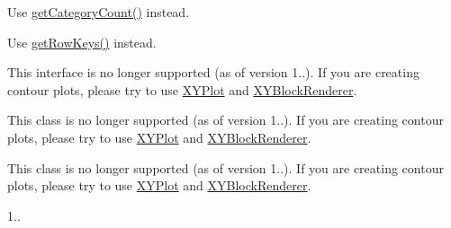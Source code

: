 \begin{DoxyRefList}
\item[\label{deprecated__deprecated000254}%
\Hypertarget{deprecated__deprecated000254}%
Member \mbox{\hyperlink{classorg_1_1jfree_1_1data_1_1category_1_1_default_interval_category_dataset_a565a96d7e8d9e7dee48ce40be982a54a}{org.jfree.data.category.Default\+Interval\+Category\+Dataset.get\+Item\+Count}} ()]Use \mbox{\hyperlink{classorg_1_1jfree_1_1data_1_1category_1_1_default_interval_category_dataset_af1e71ac84aa326b3b7ef89c398e5c0fb}{get\+Category\+Count()}} instead.  
\item[\label{deprecated__deprecated000252}%
\Hypertarget{deprecated__deprecated000252}%
Member \mbox{\hyperlink{classorg_1_1jfree_1_1data_1_1category_1_1_default_interval_category_dataset_a7e8cc76c4ac97fbf13459f1343ac5d91}{org.jfree.data.category.Default\+Interval\+Category\+Dataset.get\+Series}} ()]Use \mbox{\hyperlink{classorg_1_1jfree_1_1data_1_1category_1_1_default_interval_category_dataset_aa8a0a871f4557e0ef292fe5e9db0d55b}{get\+Row\+Keys()}} instead.  
\item[\label{deprecated__deprecated000255}%
\Hypertarget{deprecated__deprecated000255}%
Class \mbox{\hyperlink{interfaceorg_1_1jfree_1_1data_1_1contour_1_1_contour_dataset}{org.jfree.data.contour.Contour\+Dataset}} ]This interface is no longer supported (as of version 1..). If you are creating contour plots, please try to use \mbox{\hyperlink{}{X\+Y\+Plot}} and \mbox{\hyperlink{}{X\+Y\+Block\+Renderer}}.  
\item[\label{deprecated__deprecated000256}%
\Hypertarget{deprecated__deprecated000256}%
Class \mbox{\hyperlink{classorg_1_1jfree_1_1data_1_1contour_1_1_default_contour_dataset}{org.jfree.data.contour.Default\+Contour\+Dataset}} ]This class is no longer supported (as of version 1..). If you are creating contour plots, please try to use \mbox{\hyperlink{}{X\+Y\+Plot}} and \mbox{\hyperlink{}{X\+Y\+Block\+Renderer}}.  
\item[\label{deprecated__deprecated000257}%
\Hypertarget{deprecated__deprecated000257}%
Class \mbox{\hyperlink{classorg_1_1jfree_1_1data_1_1contour_1_1_non_grid_contour_dataset}{org.jfree.data.contour.Non\+Grid\+Contour\+Dataset}} ]This class is no longer supported (as of version 1..). If you are creating contour plots, please try to use \mbox{\hyperlink{}{X\+Y\+Plot}} and \mbox{\hyperlink{}{X\+Y\+Block\+Renderer}}.  
\item[\label{deprecated__deprecated000258}%
\Hypertarget{deprecated__deprecated000258}%
Class \mbox{\hyperlink{interfaceorg_1_1jfree_1_1data_1_1general_1_1_combination_dataset}{org.jfree.data.general.Combination\+Dataset}} ]1..  

\end{DoxyRefList}
